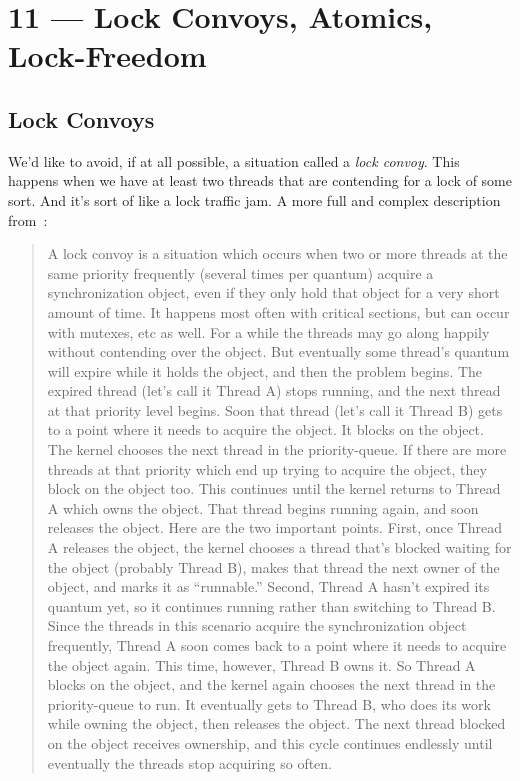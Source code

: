 \documentclass[a4paper]{report}
\begin{document}
\chapter*{11 --- Lock Convoys, Atomics, Lock-Freedom}


\section*{Lock Convoys}

We'd like to avoid, if at all possible, a situation called a \textit{lock convoy}. This happens when we have at least two threads that are contending for a lock of some sort. And it's sort of like a lock traffic jam. A more full and complex description from~\cite{lockconvoys}:

\begin{quote}
A lock convoy is a situation which occurs when two or more threads at the same priority frequently (several times per quantum) acquire a synchronization object, even if they only hold that object for a very short amount of time.  It happens most often with critical sections, but can occur with mutexes, etc as well.  For a while the threads may go along happily without contending over the object.  But eventually some thread's quantum will expire while it holds the object, and then the problem begins.  The expired thread (let's call it Thread A) stops running, and the next thread at that priority level begins.  Soon that thread (let's call it Thread B) gets to a point where it needs to acquire the object.  It blocks on the object.  The kernel chooses the next thread in the priority-queue.  If there are more threads at that priority which end up trying to acquire the object, they block on the object too.  This continues until the kernel returns to Thread A which owns the object.  That thread begins running again, and soon releases the object.  Here are the two important points.  First, once Thread A releases the object, the kernel chooses a thread that's blocked waiting for the object (probably Thread B), makes that thread the next owner of the object, and marks it as ``runnable.''  Second, Thread A hasn't expired its quantum yet, so it continues running rather than switching to Thread B.  Since the threads in this scenario acquire the synchronization object frequently, Thread A soon comes back to a point where it needs to acquire the object again.  This time, however, Thread B owns it.  So Thread A blocks on the object, and the kernel again chooses the next thread in the priority-queue to run.  It eventually gets to Thread B, who does its work while owning the object, then releases the object.  The next thread blocked on the object receives ownership, and this cycle continues endlessly until eventually the threads stop acquiring so often.
\end{quote}
\end{document}
